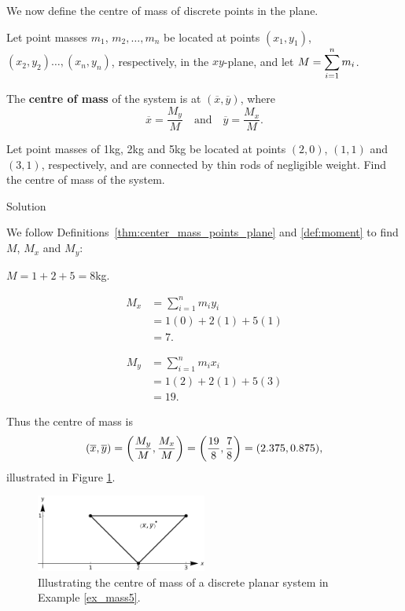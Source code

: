 We now define the centre of mass of discrete points in the plane.

\begin{definition}\label{thm:center_mass_points_plane}
Let point masses $m_1$, $m_2,\ldots,m_n$ be located at points $(x_1,y_1)$, $(x_2,y_2)\ldots,(x_n,y_n)$, respectively, in the $xy$-plane, and let $\displaystyle M = \sum_{i=1}^n m_i$.  

The \textbf{centre of mass} of the system is at $(\overline{x},\overline{y})$, where 
$$\overline{x}= \frac{M_y}{M}\quad \text{and}\quad \overline{y} = \frac{M_x}{M}.$$

\end{definition}

\begin{example}\label{ex_mass5}
Let point masses of 1kg, 2kg and 5kg be located at points $(2,0)$, $(1,1)$ and $(3,1)$, respectively, and are connected by thin rods of negligible weight. Find the centre of mass of the system.

\pagebreak
{}Solution 


We follow Definitions~\ref{thm:center_mass_points_plane} and \ref{def:moment} to find $M$, $M_x$ and $M_y$:

$M = 1+2+5 = 8$kg.

\noindent\begin{minipage}{.5\linewidth}
\begin{align*}
M_x &=  \sum_{i=1}^n m_iy_i \\
		&= 1(0) + 2(1) + 5(1) \\
		&= 7.
\end{align*}
\end{minipage}
\begin{minipage}{.5\linewidth}
\begin{align*}
M_y &=  \sum_{i=1}^n m_ix_i \\
		&= 1(2) + 2(1) + 5(3) \\
		&= 19.
\end{align*}
\end{minipage}

Thus the centre of mass is $$\displaystyle (\overline{x},\overline{y}) = \left(\frac{M_y}{M},\frac{M_x}M\right) = \left(\frac{{19}}8,\frac78\right)  =(2.375,0.875),$$ illustrated in Figure \ref{fig_double_18}.

\begin{figure}[H]
	\begin{center}
			\includegraphics[width=0.5\textwidth]{fig_double_18}
	\caption{Illustrating the centre of mass of a discrete planar system in Example \ref{ex_mass5}.}
	\label{fig_double_18}
	\end{center}
\end{figure}

\end{example}

